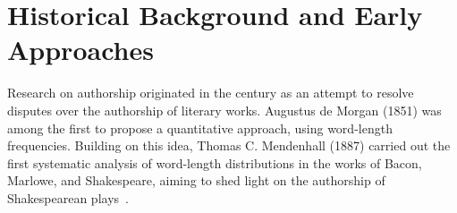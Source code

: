 \section{Historical Background and Early Approaches}

Research on authorship originated in the  century as an attempt to resolve disputes over the authorship of literary works. 
Augustus de Morgan (1851) was among the first to propose a quantitative approach, using word-length frequencies. 
Building on this idea, Thomas C. Mendenhall (1887) carried out the first systematic analysis of word-length distributions in the works of Bacon, Marlowe, and Shakespeare, aiming to shed light on the authorship of Shakespearean plays~\citep{neal_surveying_2018,stamatatos_survey_2009}.

